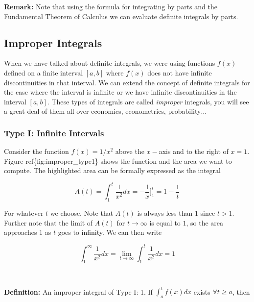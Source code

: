 \documentclass[11pt]{article}
\begin{document}
{\textbf{Remark:} Note that using the formula for integrating by parts
and the Fundamental Theorem of Calculus we can evaluate definite
integrals by parts.

    \hypertarget{improper-integrals}{%
\subsection{Improper Integrals}\label{improper-integrals}}

When we have talked about definite integrals, we were using functions
\(f(x)\) defined on a finite interval \([a, b]\) where \(f(x)\) does not
have infinite discontinuities in that interval. We can extend the
concept of definite integrals for the case where the interval is
infinite or we have infinite discontinuities in the interval \([a, b]\).
These types of integrals are called \emph{improper} integrals, you will
see a great deal of them all over economics, econometrics,
probability\(\ldots\)

\hypertarget{type-i-infinite-intervals}{%
\subsubsection{Type I: Infinite
Intervals}\label{type-i-infinite-intervals}}

Consider the function \(f(x) = 1/x^2\) above the \(x-\)axis and to the
right of \(x = 1\). Figure ref\{fig:improper\_type1\} shows the function
and the area we want to compute. The highlighted area can be formally
expressed as the integral

\[
A(t) = \int^t_1 \frac{1}{x^2} dx = -\frac{1}{x}\Bigg]^t_1 = 1 - \frac{1}{t}
\]

For whatever \(t\) we choose. Note that \(A(t)\) is always less than
\(1\) since \(t>1\). Further note that the limit of \(A(t)\) for
\(t\rightarrow\infty\) is equal to \(1\), so the area approaches \(1\)
as \(t\) goes to infinity. We can then write

\[
\int^{\infty}_1 \frac{1}{x^2} dx = \lim_{t\rightarrow\infty}\int^t_1\frac{1}{x^2} dx = 1
\]

    \begin{center}
    \end{center}
    { \hspace*{\fill} \\}
    
    \textbf{Definition:} An improper integral of Type I: 1. If
\(\int^t_a f(x) dx\) exists \(\forall t\geq a\), then

}
\end{document}
